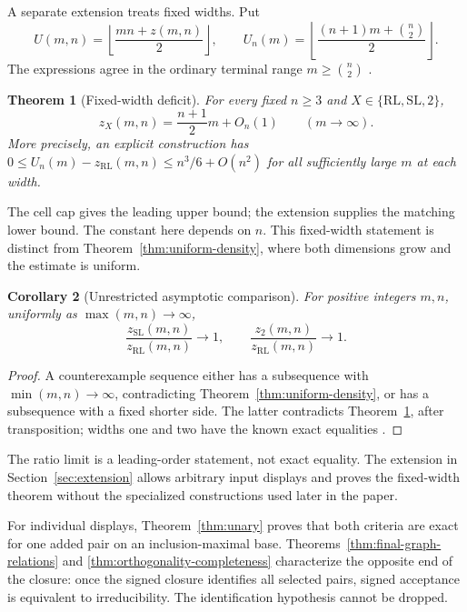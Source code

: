 \documentclass[11pt,a4paper]{article}
\newtheorem{theorem}{Theorem}[section]
\newtheorem{corollary}[theorem]{Corollary}
\theoremstyle{definition}
\newcommand{\zr}{z_{\mathrm{RL}}}
\newcommand{\zs}{z_{\mathrm{SL}}}
\newcommand{\zt}{z_2}
\newcommand{\fl}[1]{\left\lfloor #1\right\rfloor}
\begin{document}
A separate extension treats fixed widths.
Put
\begin{equation}\label{eq:cap}
 U(m,n)=\fl{\frac{mn+z(m,n)}2},\qquad
 U_n(m)=\fl{\frac{(n+1)m+\binom n2}{2}}.
\end{equation}
The expressions agree in the ordinary terminal range
$m\ge\binom n2$ \cite{Culik}.


\begin{theorem}[Fixed-width deficit]\label{thm:asymptotic}
For every fixed $n\ge3$ and $X\in\{\mathrm{RL},\mathrm{SL},2\}$,
\begin{equation}\label{eq:fixedslope}
 z_X(m,n)=\frac{n+1}{2}m+O_n(1)\qquad(m\longrightarrow\infty).
\end{equation}
More precisely, an explicit construction has
$0\le U_n(m)-\zr(m,n)\le n^3/6+O(n^2)$ for all sufficiently large
$m$ at each width.
\end{theorem}


The cell cap gives the leading upper bound; the extension supplies the
matching lower bound. The constant here depends on $n$. This fixed-width
statement is distinct from Theorem~\ref{thm:uniform-density}, where both
dimensions grow and the estimate is uniform.

\begin{corollary}[Unrestricted asymptotic comparison]\label{cor:unrestricted-asymptotic}
For positive integers $m,n$, uniformly as $\max(m,n)\to\infty$,
\[
 \frac{\zs(m,n)}{\zr(m,n)}\longrightarrow1,
 \qquad \frac{\zt(m,n)}{\zr(m,n)}\longrightarrow1.
\]
\end{corollary}
\begin{proof}
A counterexample sequence either has a subsequence with
$\min(m,n)\to\infty$, contradicting Theorem~\ref{thm:uniform-density},
or has a subsequence with a fixed shorter side. The latter contradicts
Theorem~\ref{thm:asymptotic}, after transposition; widths one and two
have the known exact equalities \cite{LQ}.
\end{proof}


The ratio limit is a leading-order statement, not exact equality. The
extension in Section~\ref{sec:extension} allows arbitrary input displays
and proves the fixed-width theorem without the specialized constructions
used later in the paper.

For individual displays, Theorem~\ref{thm:unary} proves that both criteria
are exact for one added pair on an inclusion-maximal base.
Theorems~\ref{thm:final-graph-relations} and
\ref{thm:orthogonality-completeness} characterize the opposite end of the
closure: once the signed closure identifies all selected pairs, signed acceptance is
equivalent to irreducibility. The identification hypothesis cannot be
dropped.
\end{document}
